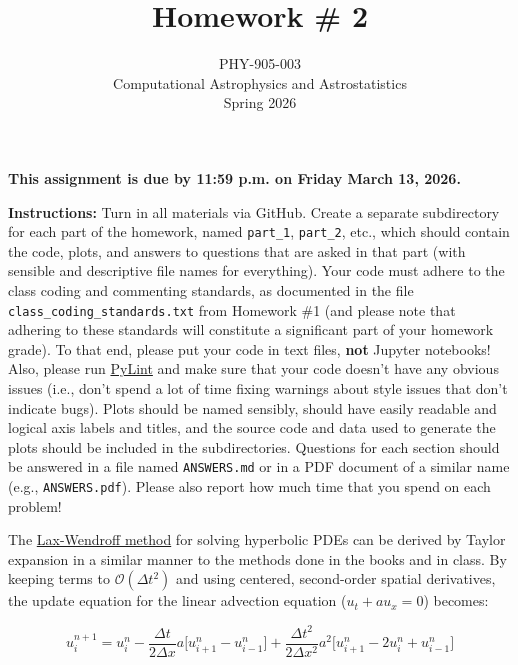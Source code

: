 \documentclass[10pt]{article}
\title{Homework \# 2}
\author{PHY-905-003\\Computational Astrophysics and
  Astrostatistics\\Spring 2026}
\date{} %
\begin{document}
 
\maketitle

\vspace{-10mm}

\centerline{ {\large
\textbf{This assignment is due by 11:59 p.m. on Friday March 13,
  2026.} } }


\vspace{3mm}

\noindent\textbf{Instructions:}
Turn in all materials via GitHub.  Create a separate subdirectory
for each part of the homework, named \texttt{part\_1},
\texttt{part\_2}, etc., which should contain the code, plots, and
answers to questions that are asked in that part (with sensible and
descriptive file names for everything).  Your code must adhere to the
class coding and commenting standards, as documented in the file
\texttt{class\_coding\_standards.txt} from Homework \#1 (and please
note that adhering to these standards will constitute a significant
part of your homework grade).  To that end, please put your code in
text files, \textbf{not} Jupyter notebooks!  Also, please run
\href{https://pypi.org/project/pylint/}{PyLint} and make sure that
your code doesn't have any obvious issues (i.e., don't spend a lot of
time fixing warnings about style issues that don't indicate bugs). 
Plots should be named
sensibly, should have easily readable and logical axis labels and
titles, and the source code and data used to generate the plots should
be included in the subdirectories.  Questions for each section should
be answered in a file named \texttt{ANSWERS.md} or in a
PDF document of a similar name (e.g., \texttt{ANSWERS.pdf}).  Please
also report how much time that you spend on each problem!

\vspace{5mm}

  The
\href{https://en.wikipedia.org/wiki/Lax\%E2\%80\%93Wendroff_method}{Lax-Wendroff
  method} for solving hyperbolic PDEs can be derived by Taylor
expansion in a similar manner to the methods done in the books and in
class.  By keeping terms to $\mathcal{O}(\Delta t^2)$ and using
centered, second-order spatial derivatives, the update equation for
the linear advection equation ($u_t + a u_x = 0$) becomes:

\begin{equation}
u_i^{n+1} = u_i^n - \frac{\Delta t}{2 \Delta x} a \big[ u_{i+1}^n -
u_{i-1}^{n}\big] + \frac{\Delta t^2}{2 \Delta x^2} a^2 \big[ u_{i+1}^n -
2 u_i^n +
u_{i-1}^{n}\big]  
\end{equation}
\end{document}
